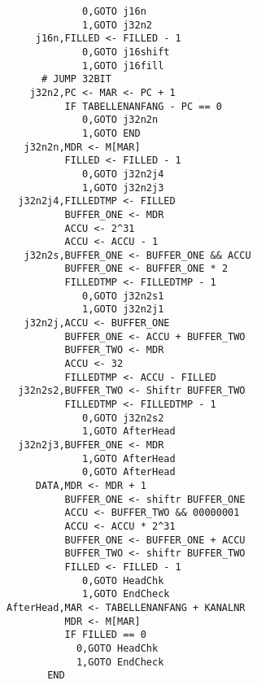 {\begin{verbatim}
             0,GOTO j16n
             1,GOTO j32n2
     j16n,FILLED <- FILLED - 1
             0,GOTO j16shift
             1,GOTO j16fill
      # JUMP 32BIT
    j32n2,PC <- MAR <- PC + 1
          IF TABELLENANFANG - PC == 0
             0,GOTO j32n2n
             1,GOTO END
   j32n2n,MDR <- M[MAR]
          FILLED <- FILLED - 1
             0,GOTO j32n2j4
             1,GOTO j32n2j3
  j32n2j4,FILLEDTMP <- FILLED
          BUFFER_ONE <- MDR
          ACCU <- 2^31
          ACCU <- ACCU - 1
   j32n2s,BUFFER_ONE <- BUFFER_ONE && ACCU
          BUFFER_ONE <- BUFFER_ONE * 2
          FILLEDTMP <- FILLEDTMP - 1
             0,GOTO j32n2s1
             1,GOTO j32n2j1
   j32n2j,ACCU <- BUFFER_ONE
          BUFFER_ONE <- ACCU + BUFFER_TWO
          BUFFER_TWO <- MDR
          ACCU <- 32
          FILLEDTMP <- ACCU - FILLED
  j32n2s2,BUFFER_TWO <- Shiftr BUFFER_TWO
          FILLEDTMP <- FILLEDTMP - 1
             0,GOTO j32n2s2
             1,GOTO AfterHead
  j32n2j3,BUFFER_ONE <- MDR
             1,GOTO AfterHead
             0,GOTO AfterHead
     DATA,MDR <- MDR + 1
          BUFFER_ONE <- shiftr BUFFER_ONE
          ACCU <- BUFFER_TWO && 00000001
          ACCU <- ACCU * 2^31
          BUFFER_ONE <- BUFFER_ONE + ACCU
          BUFFER_TWO <- shiftr BUFFER_TWO
          FILLED <- FILLED - 1
             0,GOTO HeadChk
             1,GOTO EndCheck
AfterHead,MAR <- TABELLENANFANG + KANALNR
          MDR <- M[MAR]
          IF FILLED == 0
            0,GOTO HeadChk
            1,GOTO EndCheck
       END
\end{verbatim}}
